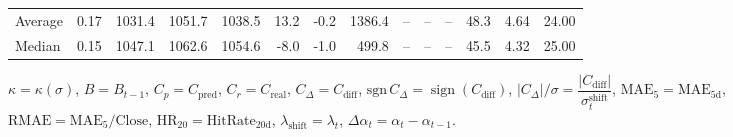 \begin{threeparttable}
{\begin{tabular}{lrrrrrrrrrrrrr}
Average &     0.17 & 1031.4 & 1051.7 & 1038.5 &       13.2 &                     -0.2 &              1386.4 &         -- &        -- &             -- &             48.3 &            4.64 &                  24.00 \\
 Median &     0.15 & 1047.1 & 1062.6 & 1054.6 &       -8.0 &                     -1.0 &               499.8 &         -- &        -- &             -- &             45.5 &            4.32 &                  25.00 \\
\bottomrule
\end{tabular}
}
\begin{tablenotes}\footnotesize
\item $\kappa=\kappa(\sigma)$, $B=B_{t-1}$, $C_p=C_{\text{pred}}$, $C_r=C_{\text{real}}$, $C_\Delta=C_{\text{diff}}$, $\mathrm{sgn}\,C_\Delta=\operatorname{sign}(C_{\text{diff}})$, $|C_\Delta|/\sigma=\dfrac{|C_{\text{diff}}|}{\sigma_t^{\text{shift}}}$, $\mathrm{MAE}_5=\mathrm{MAE}_{5\text{d}}$, $\mathrm{RMAE}= \mathrm{MAE}_5 / \text{Close}$, $\mathrm{HR}_{20}=\mathrm{HitRate}_{20\text{d}}$, 
$\lambda_{\text{shift}}=\lambda_t$, 
$\Delta\alpha_t=\alpha_t-\alpha_{t-1}$.
\end{tablenotes}
\end{threeparttable}
\endgroup
